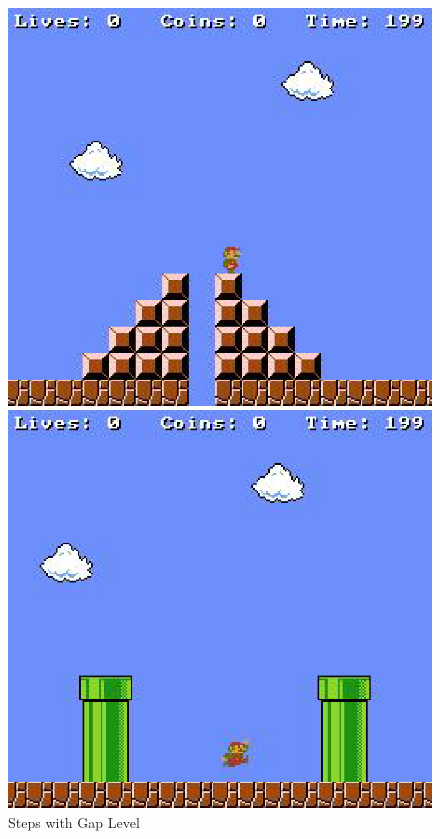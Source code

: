 \documentclass[notitlepage,a4paper,11pt]{article}
\begin{document}
	\begin{figure}[!htb]
  \includegraphics[width=\linewidth]{figs/steps_gap_level.eps}
  \caption{Steps with Gap Level}\label{fig:steps_gap_level}
\endminipage\hfill
{}
  \includegraphics[width=\linewidth]{figs/two_pipe_level.eps}

\end{figure}
\end{document}
